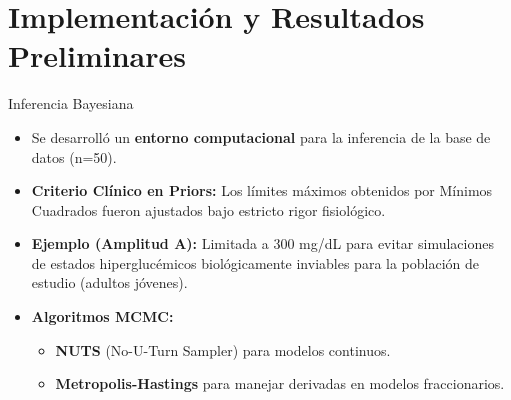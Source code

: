 \documentclass{beamer}
\begin{document}

\section{Implementación y Resultados Preliminares}

\begin{frame}{Inferencia Bayesiana}
    \begin{itemize}
        \item Se desarrolló un \textbf{entorno computacional} para la inferencia de la base de datos (n=50).
        \item \textbf{Criterio Clínico en Priors:} Los límites máximos obtenidos por Mínimos Cuadrados fueron ajustados bajo estricto rigor fisiológico. 
        \item \textbf{Ejemplo (Amplitud A):} Limitada a $300$ mg/dL para evitar simulaciones de estados hiperglucémicos biológicamente inviables para la población de estudio (adultos jóvenes).
        \item \textbf{Algoritmos MCMC:} 
        \begin{itemize}
            \item \textbf{NUTS} (No-U-Turn Sampler) para modelos continuos.
            \item \textbf{Metropolis-Hastings} para manejar derivadas en modelos fraccionarios.
        \end{itemize}
    \end{itemize}
\end{frame}
\end{document}
